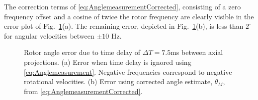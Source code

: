 \documentclass[journal]{IEEEtran}
\begin{document}
The correction terms of \eqref{eq:AnglemeasurementCorrected}, consisting of a zero frequency offset and a cosine of twice the rotor frequency are clearly visible in the error plot of Fig.~\ref{fig:Rotor-Angle-Corr}(a). The remaining error, depicted in Fig.~\ref{fig:Rotor-Angle-Corr}(b), is less than $2^\circ$ for angular velocities between $\pm10$ Hz. 

\begin{figure}
\begin{center}
\end{center}
\caption{Rotor angle error due to time delay of $\Delta T = 7.5$ms between axial projections. (a) Error when time delay is ignored using \eqref{eq:Anglemeasurement}. Negative frequencies correspond to negative rotational velocities. (b) Error using corrected angle estimate, $\theta_M$, from \eqref{eq:AnglemeasurementCorrected}. 
\label{fig:Rotor-Angle-Corr}}
\end{figure}
\end{document}
